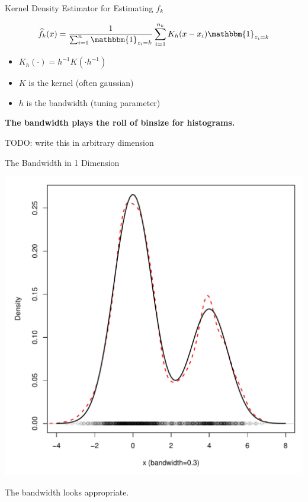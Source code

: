 \documentclass[12pt]{beamer}
\newcommand{\ind}{\mathbbm{1}}
\newcommand{\todo}[1]{{\color{red}TODO: #1}}
\begin{document}
\begin{frame}{Kernel Density Estimator for Estimating $f_k$}

  \begin{equation*}
    \widehat{f}_k(x) = \frac{1}{\sum_{i=1}^n \ind_{z_i=k}}\sum_{i=1}^{n_k} K_h(x-x_i)\ind_{z_i=k}
  \end{equation*}

  \begin{itemize}
  \item $K_h(\cdot) = h^{-1}K(\cdot h^{-1})$
  \item $K$ is the kernel (often gaussian)
  \item $h$ is the bandwidth (tuning parameter)
  \end{itemize}

  \vspace{.3in}
  
  \begin{center}
    \textbf{The bandwidth plays the roll of binsize for histograms.}
  \end{center}

  \todo{write this in arbitrary dimension}
  
\end{frame}



\begin{frame}{The Bandwidth in 1 Dimension}

  \begin{center}
    \includegraphics[scale=0.4]{figs/density2_1.pdf}
    \end{center}

\vspace{-.2in}
  
      \begin{center}
  The bandwidth looks appropriate.
      \end{center}
\end{frame}
\end{document}
